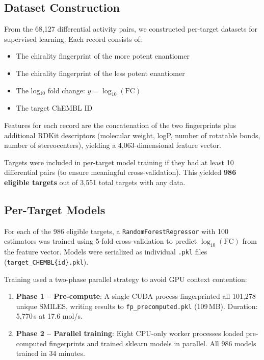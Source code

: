 \documentclass[11pt,a4paper]{article}
\begin{document}
\subsection{Dataset Construction}

From the 68,127 differential activity pairs, we constructed per-target datasets
for supervised learning. Each record consists of:

\begin{itemize}[leftmargin=1.5em]
  \item The chirality fingerprint of the more potent enantiomer
  \item The chirality fingerprint of the less potent enantiomer
  \item The log$_{10}$ fold change: $y = \log_{10}(\text{FC})$
  \item The target ChEMBL ID
\end{itemize}

Features for each record are the concatenation of the two fingerprints plus
additional RDKit descriptors (molecular weight, logP, number of rotatable bonds,
number of stereocenters), yielding a 4,063-dimensional feature vector.

Targets were included in per-target model training if they had at least 10
differential pairs (to ensure meaningful cross-validation). This yielded
\textbf{986 eligible targets} out of 3,551 total targets with any data.

\subsection{Per-Target Models}

For each of the 986 eligible targets, a \texttt{RandomForestRegressor} with
100 estimators was trained using 5-fold cross-validation to predict
$\log_{10}(\text{FC})$ from the feature vector. Models were serialized as
individual \texttt{.pkl} files (\texttt{target\_CHEMBL\{id\}.pkl}).

Training used a two-phase parallel strategy to avoid GPU context contention:

\begin{enumerate}[leftmargin=1.5em]
  \item \textbf{Phase 1 -- Pre-compute}: A single CUDA process fingerprinted all
    101,278 unique SMILES, writing results to
    \texttt{fp\_precomputed.pkl} (109\,MB). Duration: 5,770\,s at 17.6 mol/s.
  \item \textbf{Phase 2 -- Parallel training}: Eight CPU-only worker processes
    loaded pre-computed fingerprints and trained sklearn models in parallel.
    All 986 models trained in 34 minutes.
\end{enumerate}
\end{document}
